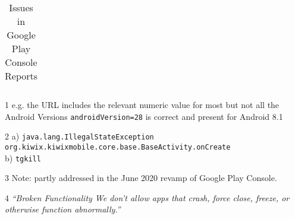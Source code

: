 \begin{table}[!htbp]
\begin{threeparttable}[t]
\begin{tabular}{p{}p{}p{}}
    \end{tabular}
    \begin{tablenotes}
    \item[1]e.g. the URL includes the relevant numeric value for most but not all the Android Versions \texttt{androidVersion=28} is correct and present for Android 8.1
    
    \item[2] a) \texttt{java.lang.IllegalStateException org.kiwix.kiwixmobile.core.base.BaseActivity.onCreate} \\
    b) \texttt{tgkill}
    
    \item[3] Note: partly addressed in the June 2020 revamp of Google Play Console.
    
    \item[4] \emph{``Broken Functionality We don’t allow apps that crash, force close, freeze, or otherwise function abnormally.”}~\cite{google_play_developer_policy_center}
    \end{tablenotes}
    
    \caption{Issues in Google Play Console Reports}
    \label{tab:issues-in-google-play-console-reports}
    \end{threeparttable}
\end{table}
\fi

